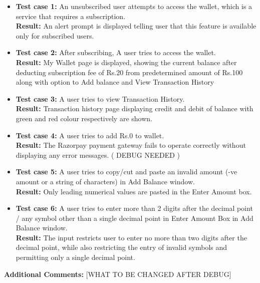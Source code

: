 \documentclass[11pt]{article}
\begin{document}
\begin{itemize}
    \item \textbf{Test case 1: }An unsubscribed user attempts to access the wallet, which is a service that requires a subscription.
    \\
    \textbf{Result: }An alert prompt is displayed telling user that this feature is available only for subscribed users.
    \item \textbf{Test case 2: }After subscribing, A user tries to access the wallet.
    \\
    \textbf{Result: }My Wallet page is displayed, showing the current balance after deducting subscription fee of Rs.20  from predetermined amount of Rs.100 along with option to Add balance and View Transaction History
    \item \textbf{Test case 3: }A user tries to view Transaction History.
    \\
    \textbf{Result: }Transaction history page displaying credit and debit of balance with green and red colour respectively are shown.
    \item \textbf{Test case 4: }A user tries to add Rs.0 to wallet.
    \\
    \textbf{Result: }The Razorpay payment gateway fails to operate correctly without displaying any error messages. ( DEBUG NEEDED )
    \item \textbf{Test case 5: }A user tries to copy/cut and paste an invalid amount (-ve amount or a string of characters) in Add Balance window.
    \\
    \textbf{Result: }Only leading numerical values are pasted in the Enter Amount box. 
    \item \textbf{Test case 6: }A user tries to enter more than 2 digits after the decimal point / any symbol other than a single decimal point in Enter Amount Box in Add Balance window.
    \\
    \textbf{Result: }The input restricts user to enter no more than two digits after the decimal point, while also restricting the entry of invalid symbols and permitting only a single decimal point.






    
    
\end{itemize}



\textbf{Additional Comments: } [WHAT TO BE CHANGED AFTER DEBUG]
\end{document}
